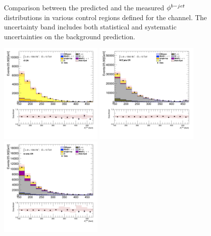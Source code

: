 \begin{figure}[!htp]
\begin{center}
			\end{center}
			\caption{
			Comparison between the predicted and the measured $\phi^{b-jet}$ distributions in various control regions defined for the \taujets channel. The uncertainty band includes both statistical and systematic uncertainties on the background prediction. 
			}
			\label{fig:bkg-bjet-phi-taujets}
		\end{figure}

		\begin{figure}[!htp]
			\begin{center}    
			\includegraphics[width=0.45\textwidth]{chapters/chapter6_HPlus/images/taujets/met_et_TTBAR.png}
			\includegraphics[width=0.45\textwidth]{chapters/chapter6_HPlus/images/taujets/met_et_WJETS.png} \\
			\includegraphics[width=0.45\textwidth]{chapters/chapter6_HPlus/images/taujets/met_et_BVETO.png}

\end{center}
\end{figure}
